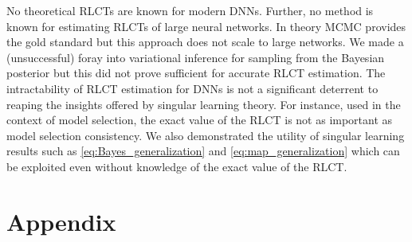 \documentclass{article} %
\begin{document}
No theoretical RLCTs are known for modern DNNs.
Further, no method is known for estimating RLCTs of large neural networks. In theory MCMC provides the gold standard but this approach does not scale to large networks. We made a (unsuccessful) foray into variational inference for sampling from the Bayesian posterior but this did not prove sufficient for accurate RLCT estimation. 
The intractability of RLCT estimation for DNNs is not a significant deterrent to reaping the insights offered by singular learning theory. For instance, used in the context of model selection, the exact value of the RLCT is not as important as model selection consistency. We also demonstrated the utility of singular learning results such as \eqref{eq:Bayes_generalization} and \eqref{eq:map_generalization} which can be exploited even without knowledge of the exact value of the RLCT.


%





\appendix
\section{Appendix}
\end{document}
